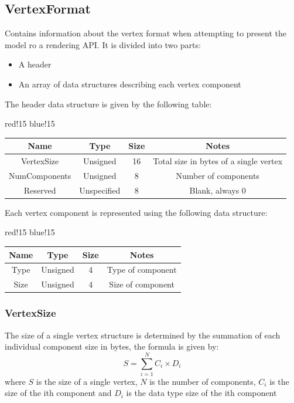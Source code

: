 \subsection{VertexFormat}
Contains information about the vertex format when attempting to present the model ro a rendering API.\newline
It is divided into two parts:
\begin{itemize}
    \item A header
    \item An array of data structures describing each vertex component
\end{itemize}
The header data structure is given by the following table:
\begin{center}
    {
        {red!15}
        {blue!15}
        \begin{tabular}{|c|c|c|c|}
            \hline
            \textbf{Name} & \textbf{Type} & \textbf{Size} & \textbf{Notes} \\
    
            \hline\hline
            VertexSize & Unsigned & 16 & Total size in bytes of a single vertex \\
            NumComponents & Unsigned & 8 & Number of components \\
            Reserved & Unspecified & 8 & Blank, always 0 \\
            \hline
        \end{tabular}
    }
\end{center}
Each vertex component is represented using the following data structure:
\begin{center}
    {
        {red!15}
        {blue!15}
        \begin{tabular}{|c|c|c|c|}
            \hline
            \textbf{Name} & \textbf{Type} & \textbf{Size} & \textbf{Notes} \\
    
            \hline\hline
            Type & Unsigned & 4 & Type of component \\
            Size & Unsigned & 4 & Size of component \\
            \hline
        \end{tabular}
    }
\end{center}

\subsubsection{VertexSize}
The size of a single vertex structure is determined by the summation of each individual component size in bytes, the formula is given by:
\begin{equation}
    S = \sum_{i=1}^{N} C_i \times D_i
\end{equation}
where $S$ is the size of a single vertex, $N$ is the number of components, $C_i$ is the size of the ith component and $D_i$ is the data type size of the ith component

